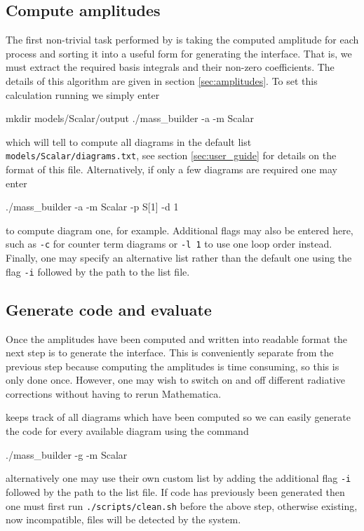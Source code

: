 \subsection{Compute amplitudes}

The first non-trivial task performed by \mb is taking the computed amplitude for each process and sorting it into a useful form for generating the \tsil interface.  That is, we must extract the required basis integrals and their non-zero coefficients.  The details of this algorithm are given in section \ref{sec:amplitudes}.  To set this calculation running we simply enter
\begin{lstterm}
mkdir models/Scalar/output
./mass_builder -a -m Scalar
\end{lstterm}
which will tell \mb to compute all diagrams in the default list \lstinline{models/Scalar/diagrams.txt}, see section \ref{sec:user_guide} for details on the format of this file.  Alternatively, if only a few diagrams are required one may enter
\begin{lstterm}
./mass_builder -a -m Scalar -p S[1] -d 1
\end{lstterm}
to compute diagram one, for example.  Additional flags may also be entered here, such as \lstinline{-c} for counter term diagrams or \lstinline{-l 1} to use one loop order instead.  Finally, one may specify an alternative list rather than the default one using the flag \lstinline{-i} followed by the path to the list file.


\subsection{Generate code and evaluate}

Once the amplitudes have been computed and written into \mb readable format the next step is to generate the \tsil interface.  This is conveniently separate from the previous step because computing the amplitudes is time consuming, so this is only done once.  However, one may wish to switch on and off different radiative corrections without having to rerun Mathematica.

\mb keeps track of all diagrams which have been computed so we can easily generate the code for every available diagram using the command
\begin{lstterm}
./mass_builder -g -m Scalar
\end{lstterm}
alternatively one may use their own custom list by adding the additional flag \lstinline{-i} followed by the path to the list file.  If code has previously been generated then one must first run \lstinline{./scripts/clean.sh} before the above step, otherwise existing, now incompatible, files will be detected by the \cmake system.

